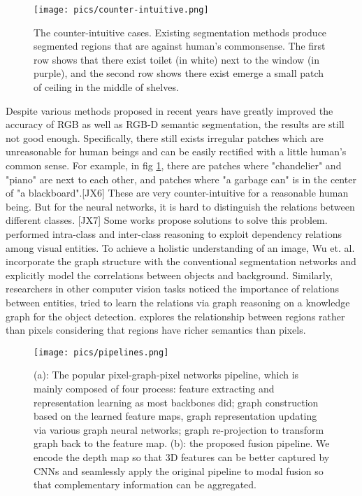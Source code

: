 ﻿\documentclass[journal]{IEEEtran}
\begin{document}
\begin{figure}
    \centering[JX5]
    \texttt{[image: pics/counter-intuitive.png]}
    \caption{The counter-intuitive cases. Existing segmentation methods produce segmented regions that are against human's commonsense. The first row shows that there exist toilet (in white) next to the window (in purple), and the second row shows there exist emerge a small patch of ceiling in the middle of shelves. }
    \label{fig_counter_intuitive}
\end{figure}

 
    Despite various methods proposed in recent years have greatly improved the accuracy of RGB as well as RGB-D semantic segmentation, the results are still not good enough. Specifically, there still exists irregular patches which are unreasonable for human beings and can be easily rectified with a little human's common sense. For example, in fig \ref{fig_counter_intuitive}, there are patches where "chandelier" and "piano" are next to each other, and patches where "a garbage can" is in the center of "a blackboard".[JX6] These are very counter-intuitive for a reasonable human being. But for the neural networks, it is hard to distinguish the relations between different classes. [JX7]
    Some works propose solutions to solve this problem. \cite{liu2021exploit} performed intra-class and inter-class reasoning to exploit dependency relations among visual entities. To achieve a holistic understanding of an image, Wu et. al. \cite{wu2020bidirectional} incorporate the graph structure with the conventional segmentation networks and explicitly model the correlations between objects and background. Similarly, researchers in other computer vision tasks noticed the importance of relations between entities, \cite{zhou2021relation} tried to learn the relations via graph reasoning on a knowledge graph for the object detection. \cite{wang2020region} explores the relationship between regions rather than pixels considering that regions have richer semantics than pixels. 
    
\begin{figure}
    \centering
    \texttt{[image: pics/pipelines.png]}
    \caption{(a): The popular pixel-graph-pixel networks pipeline, which is mainly composed of four process:  feature extracting and representation learning as most backbones did; graph construction based on the learned feature maps, graph representation updating via various graph neural networks; graph re-projection to transform graph back to the feature map. (b): the proposed fusion pipeline. We encode the depth map so that 3D features can be better captured by CNNs and seamlessly apply the original pipeline to modal fusion so that complementary information can be aggregated.}
    \label{fig_pipeline}
\end{figure}
\end{document}
